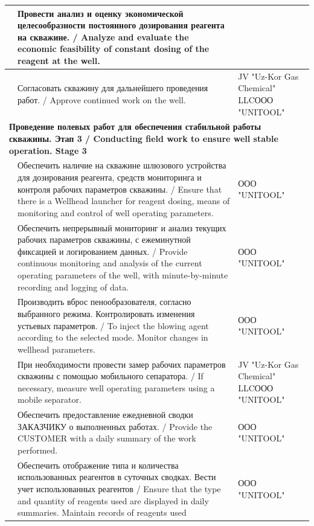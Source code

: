 \documentclass[11pt]{article}
\begin{document}
\begin{longtable}{|p{}|p{}|p{}|}
\hline
\centering 25 & Провести анализ и оценку экономической целесообразности постоянного дозирования реагента на скважине. / Analyze and evaluate the economic feasibility of constant dosing of the reagent at the well. & \\
\hline
\centering 26 & Согласовать скважину для дальнейшего проведения работ. / Approve continued work on the well. & JV "Uz-Kor Gas Chemical" LLC\newline ООО "UNITOOL" \\
\hline
\multicolumn{3}{|l|}{\textbf{Проведение полевых работ для обеспечения стабильной работы скважины. Этап 3 / Conducting field work to ensure well stable operation. Stage 3}} \\
\hline
\centering 27 & Обеспечить наличие на скважине шлюзового устройства для дозирования реагента, средств мониторинга и контроля рабочих параметров скважины. / Ensure that there is a Wellhead launcher for reagent dosing, means of monitoring and control of well operating parameters. & ООО "UNITOOL" \\
\hline
\centering 28 & Обеспечить непрерывный мониторинг и анализ текущих рабочих параметров скважины, с ежеминутной фиксацией и логированием данных. / Provide continuous monitoring and analysis of the current operating parameters of the well, with minute-by-minute recording and logging of data. & ООО "UNITOOL" \\
\hline
\centering 29 & Производить вброс пенообразователя, согласно выбранного режима. Контролировать изменения устьевых параметров. / To inject the blowing agent according to the selected mode. Monitor changes in wellhead parameters. & ООО "UNITOOL" \\
\hline
\centering 30 & При необходимости провести замер рабочих параметров скважины с помощью мобильного сепаратора. / If necessary, measure well operating parameters using a mobile separator. & JV "Uz-Kor Gas Chemical" LLC\newline ООО "UNITOOL" \\
\hline
\centering 31 & Обеспечить предоставление ежедневной сводки ЗАКАЗЧИКУ о выполненных работах. / Provide the CUSTOMER with a daily summary of the work performed. & ООО "UNITOOL" \\
\hline
\centering 32 & Обеспечить отображение типа и количества использованных реагентов в суточных сводках. Вести учет использованных реагентов / Ensure that the type and quantity of reagents used are displayed in daily summaries. Maintain records of reagents used & ООО "UNITOOL" \\

\end{longtable}
\end{document}
